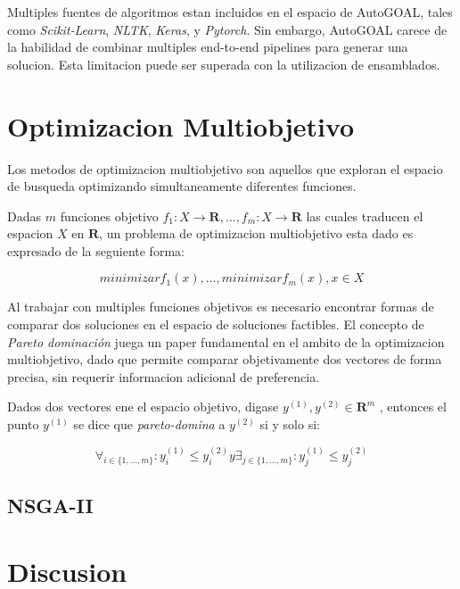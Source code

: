 Multiples fuentes de algoritmos estan incluidos en el espacio de AutoGOAL, tales como \textit{Scikit-Learn}\cite{pedregosa2011scikit}, \textit{NLTK}\cite{nltk}, \textit{Keras}\cite{chollet2015keras}, y \textit{Pytorch}\cite{paszke2019pytorch}. Sin embargo, AutoGOAL carece de la habilidad de combinar multiples end-to-end pipelines para generar una solucion. Esta limitacion puede ser superada con la utilizacion de ensamblados.

\section{Optimizacion Multiobjetivo}\label{section:multiobjective}

Los metodos de optimizacion multiobjetivo son aquellos que exploran el espacio de busqueda optimizando simultaneamente diferentes funciones.

\begin{definition}
\label{definition:multiobjective}

    Dadas $m$ funciones objetivo $f_1: X \rightarrow \mathbf{R}, \dots, f_m: X \rightarrow \mathbf{R}$ las cuales traducen el espacion $X$ en $\mathbf{R}$, un problema de optimizacion multiobjetivo esta dado es expresado de la seguiente forma:

    \begin{equation}
        minimizar f_1(x), \dots, minimizar f_m(x), x \in X
    \end{equation}
\end{definition}

Al trabajar con multiples funciones objetivos es necesario encontrar formas de comparar dos soluciones en el espacio de soluciones factibles. El concepto de \textit{Pareto dominaci\'on} juega un paper fundamental en el ambito de la optimizacion multiobjetivo, dado que permite comparar objetivamente dos vectores de forma precisa, sin requerir informacion adicional de preferencia.

\begin{definition}
\label{definition:pareto-dominance}

    Dados dos vectores ene el espacio objetivo, digase $y^{(1)}, y^{(2)} \in \mathbf{R}^m$ , entonces el punto $y^{(1)}$ se dice que \emph{pareto-domina} a $y^{(2)}$ si y solo si:

    \begin{equation}
        \forall_{i\in\{1,\dots,m\}}: y_i^{(1)} \leq y_i^{(2)} y \exists_{j\in\{1,\dots,m\}}: y_j^{(1)} \le y_j^{(2)}
    \end{equation}
\end{definition}


\subsection{NSGA-II}

\section{Discusion}\label{discussion}
